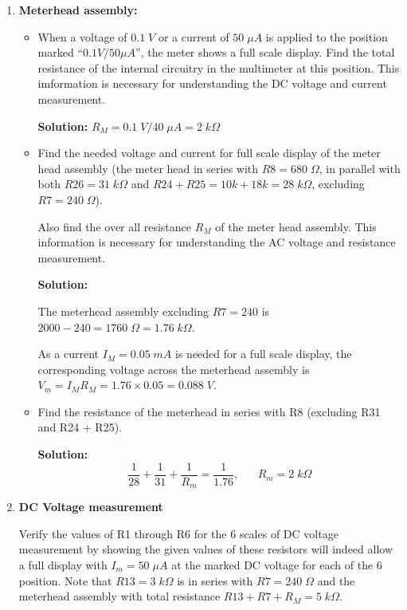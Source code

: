 

\begin{enumerate}
\item {\bf Meterhead assembly:}

  \begin{itemize}

  \item 
    When a voltage of $0.1\;V$ or a current of $50\;\mu A$ is applied to 
    the position marked ``$0.1V/50\mu A$'', the meter shows a full scale display.
    Find the total resistance of the internal circuitry in the multimeter at this
    position. This imformation is necessary for understanding the DC voltage and
    current measurement.

    {\bf Solution:} $R_M=0.1\;V/40\;\mu A=2\;k\Omega$

  \item 
    Find the needed voltage and current for full scale display of the meter
    head assembly (the meter head in series with $R8=680\;\Omega$, in parallel 
    with both $R26=31\;k\Omega$ and $R24+R25=10k+18k=28\;k\Omega$, excluding
    $R7=240\;\Omega$). 

    Also find the over all resistance $R_M$ of the meter head assembly. This 
    information is necessary for understanding the AC voltage and resistance 
    measurement.

    {\bf Solution:} 

    The meterhead assembly excluding $R7=240$ is $2000-240=1760\;\Omega=1.76\;k\Omega$.

    As a current $I_M=0.05\;mA$ is needed for a full scale display, the 
    corresponding voltage across the meterhead assembly is 
    $V_m=I_M R_M=1.76\times 0.05=0.088\;V$. 

  \item 
    Find the resistance of the meterhead in series with R8 (excluding R31 and
    R24 + R25).

    {\bf Solution:}
    \[
    \frac{1}{28}+\frac{1}{31}+\frac{1}{R_m}=\frac{1}{1.76},
    \;\;\;\;\;\;   R_m=2\;k\Omega
    \]
  \end{itemize}

\item {\bf DC Voltage measurement}
  
  Verify the values of R1 through R6 for the 6 scales of DC voltage measurement
  by showing the given values of these resistors will indeed allow a full display 
  with $I_m=50\;\mu A$ at the marked DC voltage for each of the 6 position.
  Note that $R13=3\;k\Omega$ is in series with $R7=240\;\Omega$ and the meterhead 
  assembly with total resistance $R13+R7+R_M=5\;k\Omega$. 
  

\end{enumerate}
